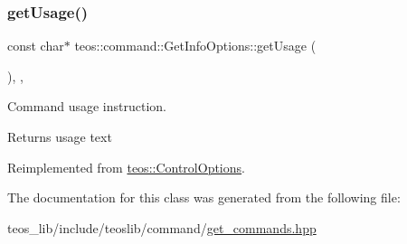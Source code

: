 \subsubsection{\texorpdfstring{get\+Usage()}{getUsage()}}
{\footnotesize\ttfamily const char$\ast$ teos\+::command\+::\+Get\+Info\+Options\+::get\+Usage (\begin{DoxyParamCaption}{ }\end{DoxyParamCaption})\hspace{0.3cm}{\ttfamily [inline]}, {\ttfamily [protected]}, {\ttfamily [virtual]}}



Command \textquotesingle{}usage\textquotesingle{} instruction. 

\begin{DoxyReturn}{Returns}
usage text 
\end{DoxyReturn}


Reimplemented from \mbox{\hyperlink{classteos_1_1_control_options_a0aa5671f9bc750ed5280c26c543874f3}{teos\+::\+Control\+Options}}.



The documentation for this class was generated from the following file\+:\begin{DoxyCompactItemize}
\item 
teos\+\_\+lib/include/teoslib/command/\mbox{\hyperlink{get__commands_8hpp}{get\+\_\+commands.\+hpp}}\end{DoxyCompactItemize}
